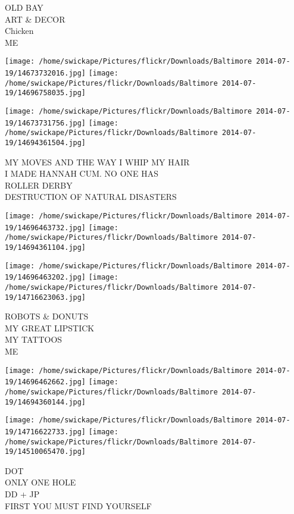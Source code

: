 \documentclass[10pt,letterpaper]{article}
\begin{document}
OLD BAY\\
ART \& DECOR\\
Chicken\\
ME\\
\pagebreak

\texttt{[image: /home/swickape/Pictures/flickr/Downloads/Baltimore 2014-07-19/14673732016.jpg]}
\texttt{[image: /home/swickape/Pictures/flickr/Downloads/Baltimore 2014-07-19/14696758035.jpg]}

\texttt{[image: /home/swickape/Pictures/flickr/Downloads/Baltimore 2014-07-19/14673731756.jpg]}
\texttt{[image: /home/swickape/Pictures/flickr/Downloads/Baltimore 2014-07-19/14694361504.jpg]}

MY MOVES AND THE WAY I WHIP MY HAIR\\
I MADE HANNAH CUM.  NO ONE HAS\\
ROLLER DERBY\\
DESTRUCTION OF NATURAL DISASTERS\\
\pagebreak

\texttt{[image: /home/swickape/Pictures/flickr/Downloads/Baltimore 2014-07-19/14696463732.jpg]}
\texttt{[image: /home/swickape/Pictures/flickr/Downloads/Baltimore 2014-07-19/14694361104.jpg]}

\texttt{[image: /home/swickape/Pictures/flickr/Downloads/Baltimore 2014-07-19/14696463202.jpg]}
\texttt{[image: /home/swickape/Pictures/flickr/Downloads/Baltimore 2014-07-19/14716623063.jpg]}

ROBOTS \& DONUTS\\
MY GREAT LIPSTICK\\
MY TATTOOS\\
ME\\
\pagebreak

\texttt{[image: /home/swickape/Pictures/flickr/Downloads/Baltimore 2014-07-19/14696462662.jpg]}
\texttt{[image: /home/swickape/Pictures/flickr/Downloads/Baltimore 2014-07-19/14694360144.jpg]}

\texttt{[image: /home/swickape/Pictures/flickr/Downloads/Baltimore 2014-07-19/14716622733.jpg]}
\texttt{[image: /home/swickape/Pictures/flickr/Downloads/Baltimore 2014-07-19/14510065470.jpg]}

DOT\\
ONLY ONE HOLE\\
DD + JP\\
FIRST YOU MUST FIND YOURSELF\\
\pagebreak
\end{document}
